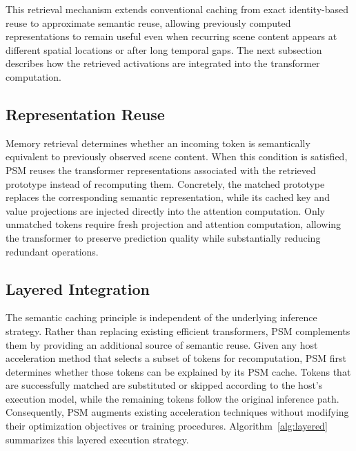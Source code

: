 \documentclass[letterpaper]{article}
\begin{document}
This retrieval mechanism extends conventional caching from exact
identity-based reuse to approximate semantic reuse, allowing previously
computed representations to remain useful even when recurring scene
content appears at different spatial locations or after long temporal
gaps. The next subsection describes how the retrieved activations are
integrated into the transformer computation.
 
 
 
\subsection{Representation Reuse}
 
Memory retrieval determines whether an incoming token is semantically
equivalent to previously observed scene content. When this condition is
satisfied, PSM reuses the transformer representations associated
with the retrieved prototype instead of recomputing them.
%
Concretely, the matched prototype replaces the corresponding semantic
representation, while its cached key and value projections are injected
directly into the attention computation. Only unmatched tokens require
fresh projection and attention computation, allowing the transformer to
preserve prediction quality while substantially reducing redundant
operations.

 
\subsection{Layered Integration}
 
The semantic caching principle is independent of the underlying
inference strategy. Rather than replacing existing efficient
transformers,
PSM complements them by providing an additional source of semantic
reuse. Given any host acceleration method that selects a subset of tokens for recomputation, PSM first determines whether those tokens can be explained by its PSM cache. Tokens that are successfully matched are substituted or skipped according to the host's execution model, while the remaining tokens follow the original inference path. Consequently, PSM augments existing acceleration techniques without modifying their optimization objectives or training procedures. Algorithm~\ref{alg:layered} summarizes this layered execution strategy.
 
 
 
\end{document}
